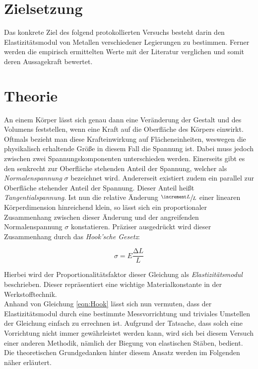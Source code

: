 %

%
\section{Zielsetzung}


Das konkrete Ziel des folgend protokollierten Versuchs besteht darin den Elastizitätsmodul von Metallen verschiedener
Legierungen zu bestimmen. Ferner werden die empirisch ermittelten Werte mit der Literatur verglichen und somit deren
Aussagekraft bewertet.

\section{Theorie}
\label{sec:Theorie}
An einem Körper lässt sich genau dann eine Veränderung der Gestalt und des Volumens feststellen, wenn eine Kraft auf die
Oberfläche des Körpers einwirkt. Oftmals bezieht man diese Krafteinwirkung auf Flächeneinheiten, weswegen die physikalisch 
erhaltende Größe in diesem Fall die Spannung ist. Dabei muss jedoch zwischen zwei Spannungskomponenten unterschieden werden.
Einerseits gibt es den senkrecht zur Oberfläche stehenden Anteil der Spannung, welcher als \emph{Normalenspannung} $\sigma$
bezeichnet wird. Andererseit existiert zudem ein parallel zur Oberfläche stehender Anteil der Spannung. Dieser Anteil
heißt \emph{Tangentialspannung}. Ist nun die relative Änderung $\sfrac{\increment L}{L}$ einer linearen Körperdimension
hinreichend klein, so lässt sich ein proportionaler Zusammenhang zwischen dieser Änderung und der angreifenden Normalenspannung
$\sigma$ konstatieren. Präziser ausgedrückt wird dieser Zusammenhang durch das \emph{Hook'sche Gesetz}:

\begin{equation}
    \sigma = E\frac{\increment L}{L}
    \label{eqn:Hook}
\end{equation}

\noindent Hierbei wird der Proportionalitätsfaktor dieser Gleichung als \emph{Elastizitätsmodul} beschrieben. Dieser 
repräsentiert eine wichtige Materialkonstante in der Werkstofftechnik.\\
\noindent Anhand von Gleichung \eqref{eqn:Hook} lässt sich nun vermuten, dass der Elastizitätsmodul durch eine bestimmte Messvorrichtung
und triviales Umstellen der Gleichung einfach zu errechnen ist. Aufgrund der Tatsache, dass solch eine Vorrichtung nicht immer
gewährleistet werden kann, wird sich bei diesem Versuch einer anderen Methodik, nämlich der Biegung von elastischen
Stäben, bedient. Die theoretischen Grundgedanken hinter diesem Ansatz werden im Folgenden näher erläutert.

